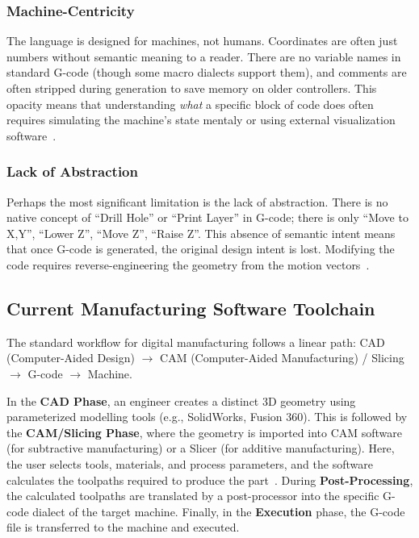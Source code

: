 \subsubsection{Machine-Centricity}
The language is designed for machines, not humans. Coordinates are often just numbers without semantic meaning to a reader. There are no variable names in standard G-code (though some macro dialects support them), and comments are often stripped during generation to save memory on older controllers. This opacity means that understanding \textit{what} a specific block of code does often requires simulating the machine's state mentaly or using external visualization software~\cite{propst_time_2025}.

\subsubsection{Lack of Abstraction}
Perhaps the most significant limitation is the lack of abstraction. There is no native concept of ``Drill Hole'' or ``Print Layer'' in G-code; there is only ``Move to X,Y'', ``Lower Z'', ``Move Z'', ``Raise Z''. This absence of semantic intent means that once G-code is generated, the original design intent is lost. Modifying the code requires reverse-engineering the geometry from the motion vectors~\cite{abdelaal_gllm_2025}.

\subsection{Current Manufacturing Software Toolchain}

The standard workflow for digital manufacturing follows a linear path: CAD (Computer-Aided Design) $\rightarrow$ CAM (Computer-Aided Manufacturing) / Slicing $\rightarrow$ G-code $\rightarrow$ Machine.

In the \textbf{CAD Phase}, an engineer creates a distinct 3D geometry using parameterized modelling tools (e.g., SolidWorks, Fusion 360). This is followed by the \textbf{CAM/Slicing Phase}, where the geometry is imported into CAM software (for subtractive manufacturing) or a Slicer (for additive manufacturing). Here, the user selects tools, materials, and process parameters, and the software calculates the toolpaths required to produce the part~\cite{noauthor_cad_2024, noauthor_how_2025}. During \textbf{Post-Processing}, the calculated toolpaths are translated by a post-processor into the specific G-code dialect of the target machine. Finally, in the \textbf{Execution} phase, the G-code file is transferred to the machine and executed.

